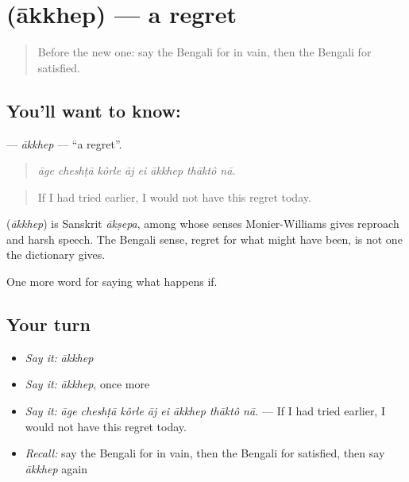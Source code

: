 \section[\texorpdfstring{\bn{আক্ষেপ} (ākkhep)}{আক্ষেপ (ākkhep)}]{ (ākkhep) — a regret}

\label{lesson:BN-C383-akkhep}



\begin{quote}
Before the new one: say the Bengali for in vain, then the Bengali for satisfied.
\end{quote}

\subsection*{You'll want to know: }
\textbf{} — \emph{ākkhep} — \textquotedblleft{}a regret\textquotedblright{}.

\begin{quote}
       
\end{quote}

\begin{quote}
\emph{āge cheshṭā kôrle āj ei ākkhep thāktô nā.}
\end{quote}

\begin{quote}
If I had tried earlier, I would not have this regret today.
\end{quote}

\begin{cousinweb}
\textbf{} (\emph{ākkhep}) is Sanskrit \emph{ākṣepa}, among whose senses Monier-Williams gives reproach and harsh speech. The Bengali sense, regret for what might have been, is not one the dictionary gives.
\end{cousinweb}

\begin{grammarlens}[title={What you've built}]
One more word for saying what happens if.
\end{grammarlens}

\subsection*{Your turn}
\begin{itemize}
\raggedright
  \item \emph{Say it:} \emph{ākkhep}
  \item \emph{Say it:} \emph{ākkhep}, once more
  \item \emph{Say it:} \emph{āge cheshṭā kôrle āj ei ākkhep thāktô nā.} — If I had tried earlier, I would not have this regret today.
  \item \emph{Recall:} say the Bengali for in vain, then the Bengali for satisfied, then say \emph{ākkhep} again
\end{itemize}

